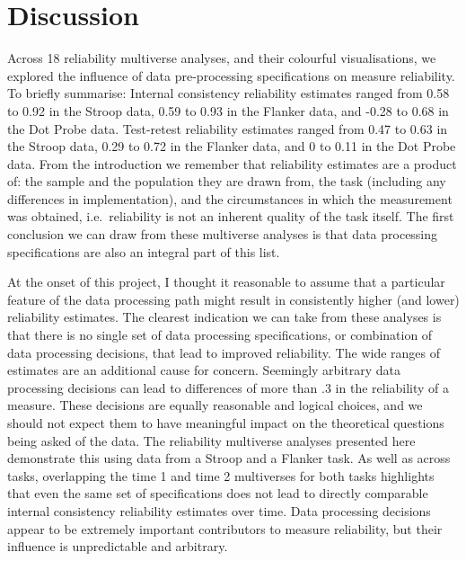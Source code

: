 \documentclass[
  english,
  man,floatsintext]{apa6}
\begin{document}
\hypertarget{discussion}{%
\section{Discussion}\label{discussion}}

Across 18 reliability multiverse analyses, and their colourful visualisations, we explored the influence of data pre-processing specifications on measure reliability. To briefly summarise: Internal consistency reliability estimates ranged from 0.58 to 0.92 in the Stroop data, 0.59 to 0.93 in the Flanker data, and -0.28 to 0.68 in the Dot Probe data. Test-retest reliability estimates ranged from 0.47 to 0.63 in the Stroop data, 0.29 to 0.72 in the Flanker data, and 0 to 0.11 in the Dot Probe data. From the introduction we remember that reliability estimates are a product of: the sample and the population they are drawn from, the task (including any differences in implementation), and the circumstances in which the measurement was obtained, i.e.~reliability is not an inherent quality of the task itself. The first conclusion we can draw from these multiverse analyses is that data processing specifications are also an integral part of this list.

At the onset of this project, I thought it reasonable to assume that a particular feature of the data processing path might result in consistently higher (and lower) reliability estimates. The clearest indication we can take from these analyses is that there is no single set of data processing specifications, or combination of data processing decisions, that lead to improved reliability. The wide ranges of estimates are an additional cause for concern. Seemingly arbitrary data processing decisions can lead to differences of more than .3 in the reliability of a measure. These decisions are equally reasonable and logical choices, and we should not expect them to have meaningful impact on the theoretical questions being asked of the data. The reliability multiverse analyses presented here demonstrate this using data from a Stroop and a Flanker task. As well as across tasks, overlapping the time 1 and time 2 multiverses for both tasks highlights that even the same set of specifications does not lead to directly comparable internal consistency reliability estimates over time. Data processing decisions appear to be extremely important contributors to measure reliability, but their influence is unpredictable and arbitrary.
\end{document}
